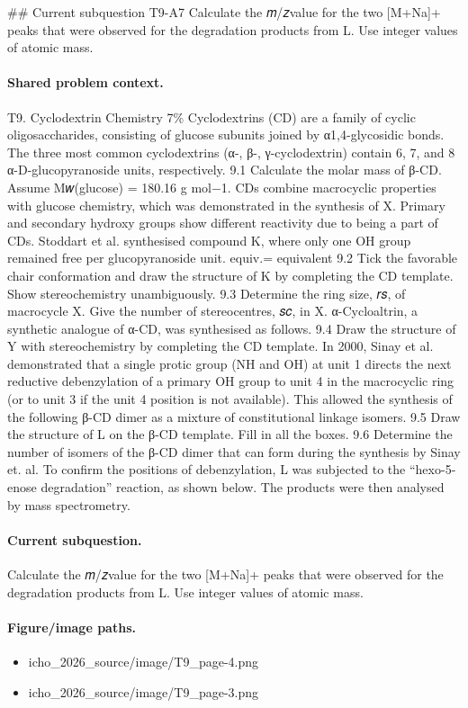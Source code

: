 \#\# Current subquestion T9-A7
Calculate the 𝑚/𝑧value for the two [M+Na]+ peaks that were observed for the degradation products from L. Use integer values of atomic mass.

\paragraph{Shared problem context.}
T9. Cyclodextrin Chemistry 7\% Cyclodextrins (CD) are a family of cyclic oligosaccharides, consisting of glucose subunits joined by α1,4-glycosidic bonds. The three most common cyclodextrins (α-, β-, γ-cyclodextrin) contain 6, 7, and 8 α-D-glucopyranoside units, respectively. 9.1 Calculate the molar mass of β-CD. Assume M𝑤(glucose) = 180.16 g mol−1. CDs combine macrocyclic properties with glucose chemistry, which was demonstrated in the synthesis of X. Primary and secondary hydroxy groups show different reactivity due to being a part of CDs. Stoddart et al. synthesised compound K, where only one OH group remained free per glucopyranoside unit. equiv.= equivalent 9.2 Tick the favorable chair conformation and draw the structure of K by completing the CD template. Show stereochemistry unambiguously. 9.3 Determine the ring size, 𝑟𝑠, of macrocycle X. Give the number of stereocentres, 𝑠𝑐, in X. α-Cycloaltrin, a synthetic analogue of α-CD, was synthesised as follows. 9.4 Draw the structure of Y with stereochemistry by completing the CD template. In 2000, Sinay et al. demonstrated that a single protic group (NH and OH) at unit 1 directs the next reductive debenzylation of a primary OH group to unit 4 in the macrocyclic ring (or to unit 3 if the unit 4 position is not available). This allowed the synthesis of the following β-CD dimer as a mixture of constitutional linkage isomers. 9.5 Draw the structure of L on the β-CD template. Fill in all the boxes. 9.6 Determine the number of isomers of the β-CD dimer that can form during the synthesis by Sinay et. al. To confirm the positions of debenzylation, L was subjected to the “hexo-5-enose degradation” reaction, as shown below. The products were then analysed by mass spectrometry.

\paragraph{Current subquestion.}
Calculate the 𝑚/𝑧value for the two [M+Na]+ peaks that were observed for the degradation products from L. Use integer values of atomic mass.

\paragraph{Figure/image paths.}
\begin{itemize}
\item icho\_2026\_source/image/T9\_page-4.png
\item icho\_2026\_source/image/T9\_page-3.png
\end{itemize}

